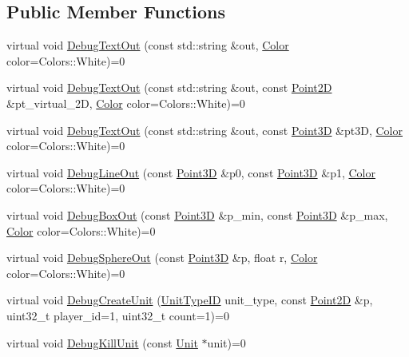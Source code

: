 \subsection*{Public Member Functions}
\begin{DoxyCompactItemize}
\item 
virtual void \hyperlink{classsc2_1_1_debug_interface_a3edaf8b4f0e0155f3b8eaf2cf672ee29}{Debug\+Text\+Out} (const std\+::string \&out, \hyperlink{structsc2_1_1_color}{Color} color=Colors\+::\+White)=0
\item 
virtual void \hyperlink{classsc2_1_1_debug_interface_a5044b5772c931b1115fd3ec40682a257}{Debug\+Text\+Out} (const std\+::string \&out, const \hyperlink{structsc2_1_1_point2_d}{Point2D} \&pt\+\_\+virtual\+\_\+2D, \hyperlink{structsc2_1_1_color}{Color} color=Colors\+::\+White)=0
\item 
virtual void \hyperlink{classsc2_1_1_debug_interface_a8037bf4a4941d49c372c6e73dfe4663c}{Debug\+Text\+Out} (const std\+::string \&out, const \hyperlink{structsc2_1_1_point3_d}{Point3D} \&pt3D, \hyperlink{structsc2_1_1_color}{Color} color=Colors\+::\+White)=0
\item 
virtual void \hyperlink{classsc2_1_1_debug_interface_a3d2232ee51265c7b97f7692ec7918ca1}{Debug\+Line\+Out} (const \hyperlink{structsc2_1_1_point3_d}{Point3D} \&p0, const \hyperlink{structsc2_1_1_point3_d}{Point3D} \&p1, \hyperlink{structsc2_1_1_color}{Color} color=Colors\+::\+White)=0
\item 
virtual void \hyperlink{classsc2_1_1_debug_interface_ab4e7e911795e9e59fca953b5c6d71b22}{Debug\+Box\+Out} (const \hyperlink{structsc2_1_1_point3_d}{Point3D} \&p\+\_\+min, const \hyperlink{structsc2_1_1_point3_d}{Point3D} \&p\+\_\+max, \hyperlink{structsc2_1_1_color}{Color} color=Colors\+::\+White)=0
\item 
virtual void \hyperlink{classsc2_1_1_debug_interface_a9c4b50b0c3b07cd77c4b9c98afc689b0}{Debug\+Sphere\+Out} (const \hyperlink{structsc2_1_1_point3_d}{Point3D} \&p, float r, \hyperlink{structsc2_1_1_color}{Color} color=Colors\+::\+White)=0
\item 
virtual void \hyperlink{classsc2_1_1_debug_interface_a74f53226964fac1ff67f071b09497a8a}{Debug\+Create\+Unit} (\hyperlink{classsc2_1_1_s_c2_type}{Unit\+Type\+ID} unit\+\_\+type, const \hyperlink{structsc2_1_1_point2_d}{Point2D} \&p, uint32\+\_\+t player\+\_\+id=1, uint32\+\_\+t count=1)=0
\item 
virtual void \hyperlink{classsc2_1_1_debug_interface_ac34014603086b4fd66a36500a63f2083}{Debug\+Kill\+Unit} (const \hyperlink{classsc2_1_1_unit}{Unit} $\ast$unit)=0

\end{DoxyCompactItemize}
